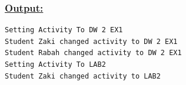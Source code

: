 \vspace{0.25cm}


\vspace{0.25cm}

\newpage


\vspace{0.5cm}


\newpage

\subsubsection*{\underline{Output:}}
\begin{lstlisting}[style=cmd]
Setting Activity To DW 2 EX1
Student Zaki changed activity to DW 2 EX1
Student Rabah changed activity to DW 2 EX1
Setting Activity To LAB2
Student Zaki changed activity to LAB2
\end{lstlisting}


